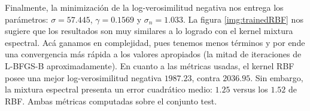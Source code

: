 \documentclass[letterpaper,11pt,oneside]{article}
\theoremstyle{break}
\begin{document}
Finalmente, la minimización de la log-verosimilitud negativa nos entrega los parámetros: $\sigma = 57.445$, $\gamma = 0.1569$ y $\sigma_n = 1.033$. La figura \ref{img:trainedRBF} nos sugiere que los resultados son muy similares a lo logrado con el kernel mixtura espectral. Acá ganamos en complejidad, pues tenemos menos términos y por ende una convergencia más rápida a los valores apropiados (la mitad de iteraciones de L-BFGS-B aproximadamente). En cuanto a las métricas usadas, el kernel RBF posee una mejor log-verosimilitud negativa $1987.23$, contra $2036.95$. Sin embargo, la mixtura espectral presenta un error cuadrático medio: $1.25$ versus los $1.52$ de RBF. Ambas métricas computadas sobre el conjunto test.



\end{document}
